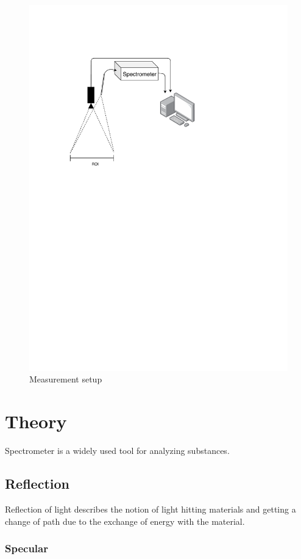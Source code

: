 \documentclass{article}
\begin{document}
\begin{figure}[H]
    \centering
    \includegraphics{figures/pt_setup.pdf}
    \caption{Measurement setup}
    \label{}
\end{figure}


\section{Theory}
Spectrometer is a widely used tool for analyzing substances. 

\subsection{Reflection}
Reflection of light describes the notion of light hitting materials and getting a change of path due to the exchange of energy with the material. 

\subsubsection{Specular}
\end{document}
